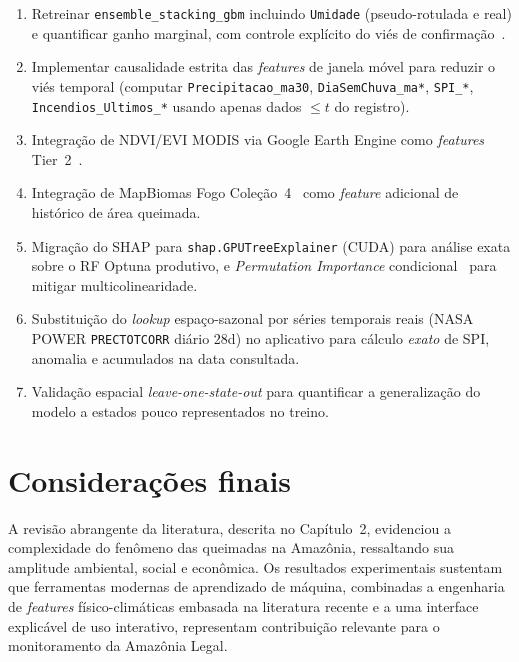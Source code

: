 \begin{enumerate}
  \item Retreinar \texttt{ensemble\_stacking\_gbm} incluindo \texttt{Umidade} (pseudo-rotulada e real) e quantificar ganho marginal, com controle explícito do viés de confirmação~\cite{arazo2020pseudo}.

  \item Implementar causalidade estrita das \emph{features} de janela móvel para reduzir o viés temporal (computar \texttt{Precipitacao\_ma30}, \texttt{DiaSemChuva\_ma*}, \texttt{SPI\_*}, \texttt{Incendios\_Ultimos\_*} usando apenas dados \(\leq t\) do registro).

  \item Integração de NDVI/EVI MODIS via Google Earth Engine como \emph{features} Tier~2~\cite{cheerala2025probabilistic}.

  \item Integração de MapBiomas Fogo Coleção~4~\cite{mapbiomasfogo} como \emph{feature} adicional de histórico de área queimada.

  \item Migração do SHAP para \texttt{shap.GPUTreeExplainer} (CUDA) para análise exata sobre o RF Optuna produtivo, e \emph{Permutation Importance} condicional~\cite{hooker2021unrestricted} para mitigar multicolinearidade.

  \item Substituição do \emph{lookup} espaço-sazonal por séries temporais reais (NASA POWER \texttt{PRECTOTCORR} diário 28d) no aplicativo para cálculo \emph{exato} de SPI, anomalia e acumulados na data consultada.

  \item Validação espacial \emph{leave-one-state-out} para quantificar a generalização do modelo a estados pouco representados no treino.
\end{enumerate}

\section{Considerações finais}
\label{sec:conclusao_consideracoes}

A revisão abrangente da literatura, descrita no Capítulo~2, evidenciou a complexidade do fenômeno das queimadas na Amazônia, ressaltando sua amplitude ambiental, social e econômica. Os resultados experimentais sustentam que ferramentas modernas de aprendizado de máquina, combinadas a engenharia de \emph{features} físico-climáticas embasada na literatura recente e a uma interface explicável de uso interativo, representam contribuição relevante para o monitoramento da Amazônia Legal.

